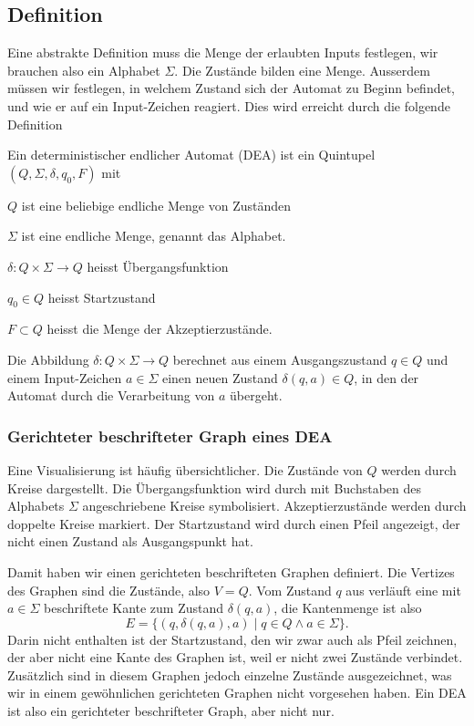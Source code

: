 \subsection{Definition\label{regulaer:definition-dea}}
%
%
%
Eine abstrakte Definition muss die Menge der erlaubten Inputs
festlegen, wir brauchen also ein Alphabet $\Sigma$.
Die Zustände bilden eine Menge.
Ausserdem müssen wir festlegen, in welchem Zustand
sich der Automat zu Beginn befindet, und wie er auf ein Input-Zeichen
reagiert.
Dies wird erreicht durch die folgende Definition
\begin{definition}
Ein deterministischer endlicher Automat (DEA) ist ein Quintupel
$(Q,\Sigma,\delta, q_0,F)$ mit
\begin{compactenum}
\item $Q$ ist eine beliebige endliche Menge von Zuständen
\item $\Sigma$ ist eine endliche Menge, genannt das Alphabet.
%
\item $\delta\colon Q\times\Sigma\to Q$ heisst Übergangsfunktion
%
\item $q_0\in Q$ heisst Startzustand
%
\item $F\subset Q$ heisst die Menge der Akzeptierzustände.
\end{compactenum}
\end{definition}
Die Abbildung $\delta\colon Q\times \Sigma\to Q$ berechnet
aus einem Ausgangszustand $q\in Q$ und einem Input-Zeichen $a\in\Sigma$
einen neuen Zustand $\delta(q,a)\in Q$, in den der Automat durch
die Verarbeitung von $a$ übergeht.

\subsubsection{Gerichteter beschrifteter Graph eines DEA}
%
Eine Visualisierung ist häufig übersichtlicher.
Die Zustände von $Q$ werden durch Kreise dargestellt.
Die Übergangsfunktion wird durch mit Buchstaben des Alphabets $\Sigma$
angeschriebene Kreise symbolisiert.
Akzeptierzustände werden durch doppelte Kreise markiert.
Der Startzustand wird durch einen
Pfeil angezeigt, der nicht einen Zustand als Ausgangspunkt hat.

Damit haben wir einen gerichteten beschrifteten Graphen definiert.
Die Vertizes des Graphen sind die Zustände, also $V=Q$.
Vom Zustand $q$ aus verläuft eine mit $a\in\Sigma$ beschriftete
Kante zum Zustand $\delta(q,a)$, 
die Kantenmenge
ist also
\[
E=\{(q,\delta(q,a),a)\;|\; q\in Q\wedge a\in\Sigma\}.
\]
Darin nicht enthalten ist der Startzustand, den wir zwar auch als
Pfeil zeichnen, der aber nicht eine Kante des Graphen ist, weil
er nicht zwei Zustände verbindet.
Zusätzlich sind in diesem Graphen jedoch einzelne Zustände ausgezeichnet,
was wir in einem gewöhnlichen gerichteten Graphen nicht vorgesehen
haben.
Ein DEA ist also ein gerichteter beschrifteter Graph, aber nicht
nur.

